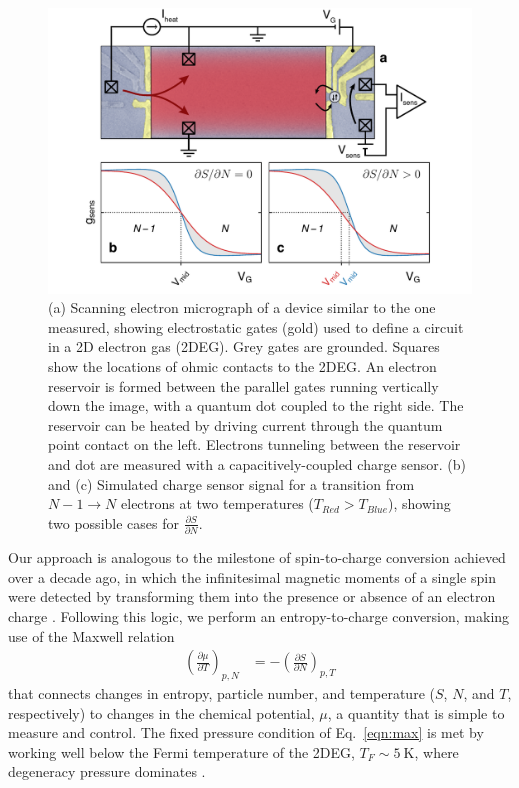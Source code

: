 \documentclass[twocolumn,showpacs,amsmath,amssymb,prl,aps,superscriptaddress]{revtex4-1}
\begin{document}
\begin{figure}[!]
        \includegraphics[width=1.0\columnwidth]{../figures/figure_1_annotated.pdf}
        \caption{\label{fig:fig1}(a) Scanning electron micrograph of a device similar to the one measured, showing electrostatic gates (gold) used to define a circuit in a 2D electron gas (2DEG). Grey gates are grounded. Squares show the locations of ohmic contacts to the 2DEG. An electron reservoir is formed between the parallel gates running vertically down the image, with a quantum dot coupled to the right side. The reservoir can be heated by driving current through the quantum point contact on the left.  Electrons tunneling between the reservoir and dot are measured with a capacitively-coupled charge sensor. (b) and (c) Simulated charge sensor signal for a transition from $N-1 \rightarrow N$ electrons at two temperatures ($T_{Red} > T_{Blue}$), showing two possible cases for $\frac{\partial S}{\partial N}$.}
\end{figure}

Our approach is analogous to the milestone of spin-to-charge conversion achieved over a decade ago, in which the infinitesimal magnetic moments of a single spin were detected by transforming them into the presence or absence of an electron charge \cite{Elzerman2004, Ono2004}.  Following this logic, we perform an entropy-to-charge conversion, making use of the Maxwell relation
%
\begin{align}
\label{eqn:max}
        \left(\frac{\partial \mu}{\partial T}\right)_{p,N} &= -\left(\frac{\partial S}{\partial N}\right)_{p,T}
\end{align}
%
that connects changes in entropy, particle number, and temperature ($S$, $N$, and $T$, respectively) to changes in the chemical potential, $\mu$, a quantity that is simple to measure and control. The fixed pressure condition of Eq.~\ref{eqn:max} is met by working well below the Fermi temperature of the 2DEG, $T_F \sim \SI{5}{\kelvin}$, where degeneracy pressure dominates \cite{Landau1969}.
\end{document}
